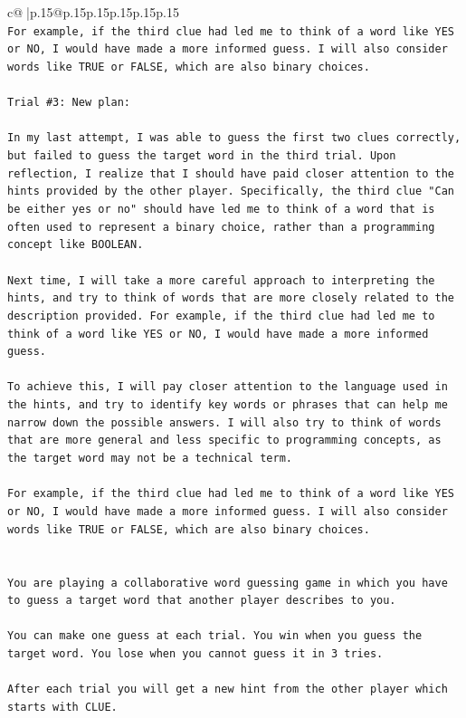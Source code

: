 \documentclass{article}
\begin{document}
{\begin{supertabular}{c@{$\;$}|p{.15\linewidth}@{}p{.15\linewidth}p{.15\linewidth}p{.15\linewidth}p{.15\linewidth}p{.15\linewidth}}
{{{\\ 
\texttt{For example, if the third clue had led me to think of a word like YES or NO, I would have made a more informed guess. I will also consider words like TRUE or FALSE, which are also binary choices.} \\
\\ 
\texttt{Trial \#3: New plan: } \\
\\ 
\texttt{In my last attempt, I was able to guess the first two clues correctly, but failed to guess the target word in the third trial. Upon reflection, I realize that I should have paid closer attention to the hints provided by the other player. Specifically, the third clue "Can be either yes or no" should have led me to think of a word that is often used to represent a binary choice, rather than a programming concept like BOOLEAN.} \\
\\ 
\texttt{Next time, I will take a more careful approach to interpreting the hints, and try to think of words that are more closely related to the description provided. For example, if the third clue had led me to think of a word like YES or NO, I would have made a more informed guess. } \\
\\ 
\texttt{To achieve this, I will pay closer attention to the language used in the hints, and try to identify key words or phrases that can help me narrow down the possible answers. I will also try to think of words that are more general and less specific to programming concepts, as the target word may not be a technical term. } \\
\\ 
\texttt{For example, if the third clue had led me to think of a word like YES or NO, I would have made a more informed guess. I will also consider words like TRUE or FALSE, which are also binary choices.} \\
\\ 
\\ 
\texttt{You are playing a collaborative word guessing game in which you have to guess a target word that another player describes to you.} \\
\\ 
\texttt{You can make one guess at each trial. You win when you guess the target word. You lose when you cannot guess it in 3 tries.} \\
\\ 
\texttt{After each trial you will get a new hint from the other player which starts with CLUE.} \\
}}}
\end{supertabular}}
\end{document}
